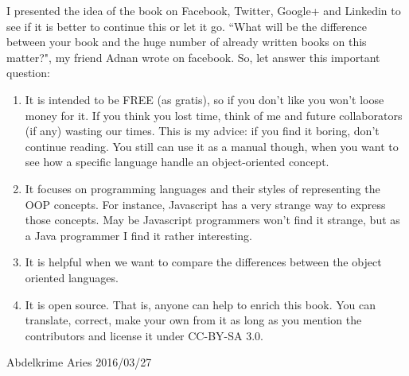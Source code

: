 \documentclass[12pt]{book}
\begin{document}
I presented the idea of the book on Facebook, Twitter, Google+ and Linkedin to see if it is better to continue this or let it go.
``What will be the difference between your book and the huge number of already written books on this matter?", my friend Adnan wrote on facebook.
So, let answer this important question:
\begin{enumerate}
\item It is intended to be FREE (as gratis), so if you don't like you won't loose money for it.
If you think you lost time, think of me and future collaborators (if any) wasting our times.
This is my advice: if you find it boring, don't continue reading.
You still can use it as a manual though, when you want to see how a specific language handle an object-oriented concept.

\item It focuses on programming languages and their styles of representing the OOP concepts.
For instance, Javascript has a very strange way to express those concepts.
May be Javascript programmers won't find it strange, but as a Java programmer I find it rather interesting.

\item It is helpful when we want to compare the differences between the object oriented languages.

\item It is open source.
That is, anyone can help to enrich this book.
You can translate, correct, make your own from it as long as you mention the contributors and license it under CC-BY-SA 3.0.

\end{enumerate}
\vfill
\begin{flushright}
Abdelkrime Aries 2016/03/27
\end{flushright}

\ifx\wholebook\relax\else
% 
% 
	
\end{document}
